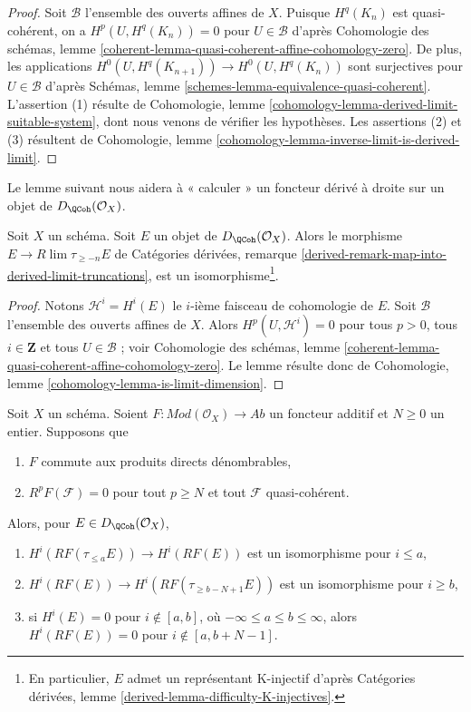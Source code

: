 \begin{proof}
Soit $\mathcal{B}$ l'ensemble des ouverts affines de $X$.
Puisque $H^q(K_n)$ est quasi-cohérent, on a $H^p(U, H^q(K_n)) = 0$
pour $U \in \mathcal{B}$ d'après Cohomologie des schémas, lemme
\ref{coherent-lemma-quasi-coherent-affine-cohomology-zero}.
De plus, les applications $H^0(U, H^q(K_{n + 1})) \to H^0(U, H^q(K_n))$
sont surjectives pour $U \in \mathcal{B}$ d'après
Schémas, lemme \ref{schemes-lemma-equivalence-quasi-coherent}.
L'assertion (1) résulte de Cohomologie, lemme
\ref{cohomology-lemma-derived-limit-suitable-system},
dont nous venons de vérifier les hypothèses.
Les assertions (2) et (3) résultent de
Cohomologie, lemme \ref{cohomology-lemma-inverse-limit-is-derived-limit}.
\end{proof}

\noindent
Le lemme suivant nous aidera à « calculer » un foncteur dérivé à droite
sur un objet de $D_\QCoh(\mathcal{O}_X)$.

\begin{lemma}
\label{lemma-nice-K-injective}
Soit $X$ un schéma. Soit $E$ un objet de
$D_\QCoh(\mathcal{O}_X)$. Alors le morphisme $E \to R\lim \tau_{\geq -n}E$ de
Catégories dérivées, remarque
\ref{derived-remark-map-into-derived-limit-truncations},
est un isomorphisme\footnote{En particulier,
$E$ admet un représentant K-injectif d'après
Catégories dérivées, lemme \ref{derived-lemma-difficulty-K-injectives}.}.
\end{lemma}

\begin{proof}
Notons $\mathcal{H}^i = H^i(E)$ le $i$-ième faisceau de cohomologie de $E$.
Soit $\mathcal{B}$ l'ensemble des ouverts affines de $X$. Alors
$H^p(U, \mathcal{H}^i) = 0$ pour tous $p > 0$, tous $i \in \mathbf{Z}$
et tous $U \in \mathcal{B}$ ; voir
Cohomologie des schémas, lemme
\ref{coherent-lemma-quasi-coherent-affine-cohomology-zero}.
Le lemme résulte donc de
Cohomologie, lemme \ref{cohomology-lemma-is-limit-dimension}.
\end{proof}

\begin{lemma}
\label{lemma-application-nice-K-injective}
Soit $X$ un schéma. Soient $F : \textit{Mod}(\mathcal{O}_X) \to \textit{Ab}$
un foncteur additif et $N \geq 0$ un entier. Supposons que
\begin{enumerate}
\item $F$ commute aux produits directs dénombrables,
\item $R^pF(\mathcal{F}) = 0$ pour tout $p \geq N$ et tout $\mathcal{F}$
quasi-cohérent.
\end{enumerate}
Alors, pour $E \in D_\QCoh(\mathcal{O}_X)$,
\begin{enumerate}
\item $H^i(RF(\tau_{\leq a}E)) \to H^i(RF(E))$ est un isomorphisme
pour $i \leq a$,
\item $H^i(RF(E)) \to H^i(RF(\tau_{\geq b - N + 1}E))$ est un isomorphisme
pour $i \geq b$,
\item si $H^i(E) = 0$ pour $i \not \in [a, b]$, où
$-\infty \leq a \leq b \leq \infty$, alors $H^i(RF(E)) = 0$
pour $i \not \in [a, b + N - 1]$.
\end{enumerate}
\end{lemma}

